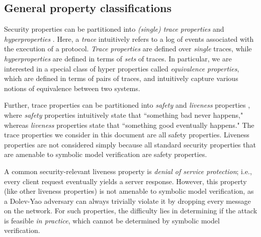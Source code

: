 \documentclass{article}
\theoremstyle{definition}
\begin{document}
\subsection{General property classifications}
Security properties can be partitioned into \emph{(single) trace properties} and \emph{hyperproperties} \cite{hyperproperties}. 
Here, a \emph{trace} intuitively refers to a log of events associated with the execution of a protocol.
\emph{Trace properties} are defined over \emph{single} traces, while \emph{hyperproperties} are defined in terms of \emph{sets} of traces.
In particular, we are interested in a special class of hyper properties called \emph{equivalence properties}, 
which are defined in terms of pairs of traces, and intuitively capture various notions of equivalence between two systems.

Further, trace properties can be partitioned into \emph{safety} and \emph{liveness} properties \cite{hyperproperties}, 
where \emph{safety} properties intuitively state that ``something bad never happens," 
whereas \emph{liveness} properties state that ``something good eventually happens." 
The trace properties we consider in this document are all safety properties.
Liveness properties are not considered simply because all standard security properties that are amenable 
to symbolic model verification are safety properties.

A common security-relevant liveness property is \emph{denial of service protection};
i.e., every client request eventually yields a server response. 
However, this property (like other liveness properties) is not amenable to symbolic model verification, 
as a Dolev-Yao adversary can always trivially violate it by dropping every message on the network.
For such properties, the difficulty lies in determining if the attack is feasible \emph{in practice},
which cannot be determined by symbolic model verification.
\end{document}
